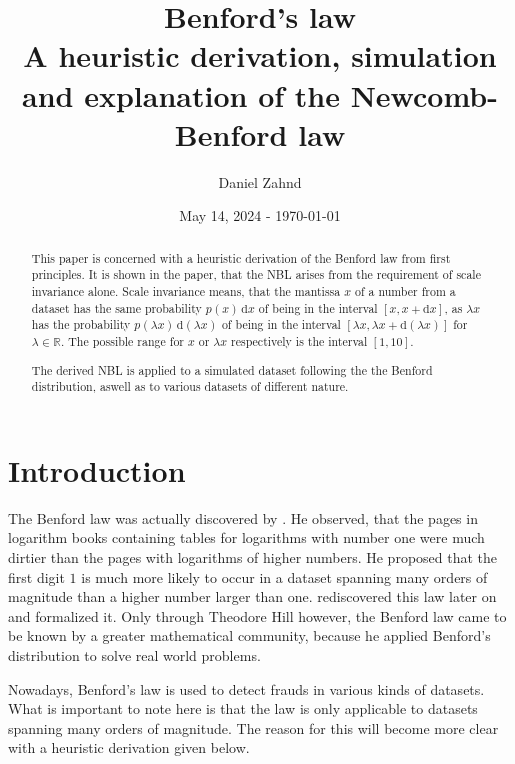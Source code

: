 \documentclass[a4paper,11pt, twocolumn]{article}
\author{Daniel Zahnd}
\date{May 14, 2024 - \today}
\title{Benford's law \\ \vspace{0.5cm} \normalsize A heuristic derivation, simulation and explanation of the Newcomb-Benford law}
\begin{document}
\maketitle


\begin{abstract}
This paper is concerned with a heuristic derivation of the Benford law from first principles. It is shown in the paper, that the NBL arises from the requirement of scale invariance alone. Scale invariance means, that the mantissa $x$ of a number from a dataset has the same probability $p(x)\,\mathrm{d}x$ of being in the interval $[x, x + \mathrm{d}x]$, as $\lambda x$ has the probability $p(\lambda x)\,\mathrm{d}(\lambda x)$ of being in the interval $[\lambda x, \lambda x + \mathrm{d}(\lambda x)]$ for $\lambda \in \mathbb{R}$. The possible range for $x$ or $\lambda x$ respectively is the interval $[1,10]$.

The derived NBL is applied to a simulated dataset following the the Benford distribution, aswell as to various datasets of different nature.
\end{abstract}

\section{Introduction}
The Benford law was actually discovered by \cite{Newcomb1881}. He observed, that the pages in logarithm books containing tables for logarithms with number one were much dirtier than the pages with logarithms of higher numbers. He proposed that the first digit $1$ is much more likely to occur in a dataset spanning many orders of magnitude than a higher number larger than one. \cite{Benford1938} rediscovered this law later on and formalized it. Only through Theodore Hill however, the Benford law came to be known by a greater mathematical community, because he applied Benford's distribution to solve real world problems.

Nowadays, Benford's law is used to detect frauds in various kinds of datasets. What is important to note here is that the law is only applicable to datasets spanning many orders of magnitude. The reason for this will become more clear with a heuristic derivation given below.
\end{document}
